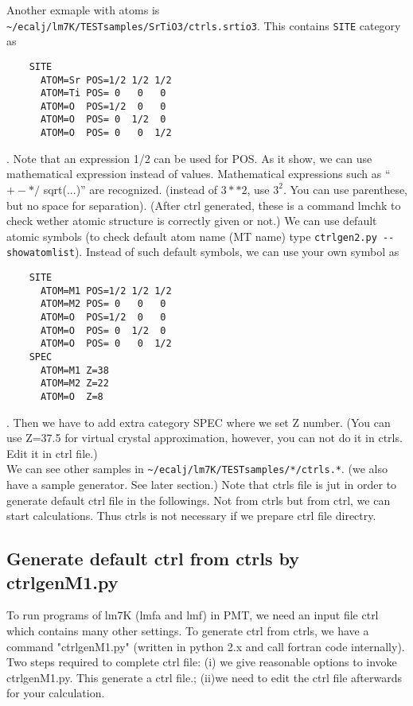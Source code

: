 \documentclass[a4paper,10pt,epsf,fleqn]{article}
\begin{document}
Another exmaple with atoms is 
\verb+~/ecalj/lm7K/TESTsamples/SrTiO3/ctrls.srtio3+. This
contains \verb+SITE+ category as
\begin{verbatim}
    SITE
      ATOM=Sr POS=1/2 1/2 1/2
      ATOM=Ti POS= 0   0   0
      ATOM=O  POS=1/2  0   0
      ATOM=O  POS= 0  1/2  0
      ATOM=O  POS= 0   0  1/2
\end{verbatim}
. Note that an expression 1/2 can be used for POS. 
As it show, we can use mathematical expression instead of values.
Mathematical expressions such as ``$+ -  * /$ sqrt(...)'' are recognized.
(instead of $3**2$, use $3^2$. You can use parenthese, but no space for separation).
(After ctrl generated, these is a command lmchk to check wether atomic
structure is correctly given or not.)
We can use default atomic symbols (to check default atom name (MT name) type \verb+ctrlgen2.py --showatomlist+).
Instead of such default symbols, we can use your own symbol as
\begin{verbatim}
    SITE
      ATOM=M1 POS=1/2 1/2 1/2
      ATOM=M2 POS= 0   0   0
      ATOM=O  POS=1/2  0   0
      ATOM=O  POS= 0  1/2  0
      ATOM=O  POS= 0   0  1/2
    SPEC
      ATOM=M1 Z=38
      ATOM=M2 Z=22
      ATOM=O  Z=8
\end{verbatim}
. Then we have to add extra category SPEC where we set Z number.
(You can use Z=37.5 for virtual crystal approximation, however, 
you can not do it in ctrls. Edit it in ctrl file.)\\

We can see other samples in \verb+~/ecalj/lm7K/TESTsamples/*/ctrls.*+.
(we also have a sample generator. See later section.)
Note that ctrls file is jut in order to generate default ctrl file in
the followings. Not from ctrls but from ctrl, we can start calculations.
Thus ctrls is not necessary if we prepare ctrl file directry.


\subsection{Generate default ctrl from ctrls by ctrlgenM1.py}
To run programs of lm7K (lmfa and lmf) in PMT,
we need an input file ctrl which contains many other settings.
To generate ctrl from ctrls, we have a command "ctrlgenM1.py" (written
in python 2.x and call fortran code internally).
Two steps required to complete ctrl file:
(i) we give reasonable options to invoke ctrlgenM1.py. 
This generate a ctrl file.;
(ii)we need to edit the ctrl file afterwards for your calculation.
\end{document}
